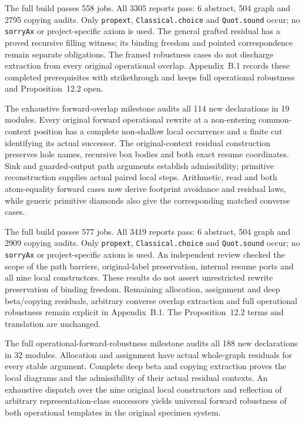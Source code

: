 The full build passes 558 jobs. All 3305 reports pass: 6 abstract, 504 graph
and 2795 copying audits. Only \texttt{propext}, \texttt{Classical.choice} and
\texttt{Quot.sound} occur; no \texttt{sorryAx} or project-specific axiom is
used. The general grafted residual has a proved recursive filling witness;
its binding freedom and pointed correspondence remain separate obligations.
The framed robustness cases do not discharge extraction from every original
operational overlap. Appendix~B.1 records these completed prerequisites with
strikethrough and keeps full operational robustness and Proposition~12.2 open.


The exhaustive forward-overlap milestone audits all 114 new declarations in
19 modules. Every original forward operational rewrite at a non-entering common-context
position has a complete non-shallow local occurrence and a finite cut identifying its actual successor.
The original-context residual construction preserves hole names, recursive
box bodies and both exact resume coordinates. Sink and guarded-output path
arguments establish admissibility; primitive reconstruction supplies actual
paired local steps. Arithmetic, read and both atom-equality forward cases
now derive footprint avoidance and residual laws, while generic primitive
diamonds also give the corresponding matched converse cases.

The full build passes 577 jobs. All 3419 reports pass: 6 abstract, 504 graph
and 2909 copying audits. Only \texttt{propext}, \texttt{Classical.choice} and
\texttt{Quot.sound} occur; no \texttt{sorryAx} or project-specific axiom is used.
An independent review checked the scope of the path barriers, original-label
preservation, internal resume ports and all nine local constructors. These
results do not assert unrestricted rewrite preservation of binding freedom.
Remaining allocation, assignment and deep beta/copying residuals, arbitrary
converse overlap extraction and full operational robustness remain explicit
in Appendix~B.1. The Proposition~12.2 terms and translation are unchanged.


The full operational-forward-robustness milestone audits all 188 new declarations
in 32 modules. Allocation and assignment have actual whole-graph residuals for
every stable argument. Complete deep beta and copying extraction proves the
local diagrams and the admissibility of their actual residual contexts.
An exhaustive dispatch over the nine original local constructors and reflection
of arbitrary representation-class successors yields universal forward
robustness of both operational templates in the original specimen system.

